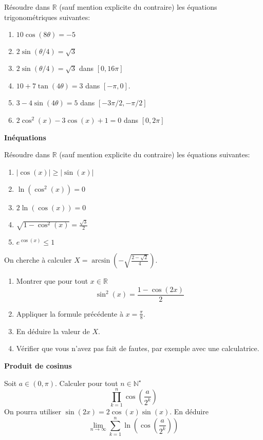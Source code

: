 \documentclass[a4paper,12pt]{article}
\def\N{\mathbb{N}}
\begin{document}
Résoudre dans $\mathbb{R}$ (sauf mention explicite du contraire) les équations trigonométriques suivantes:
\begin{enumerate}
\item $10\cos(8\theta) = -5$
\item $2\sin(\theta/4) = \sqrt{3}$
\item $2\sin(\theta/4) = \sqrt{3}$ dans $[0, 16\pi]$
\item $10 + 7\tan(4\theta) = 3$ dans $[-\pi, 0]$.
\item $3 - 4\sin(4\theta) = 5$ dans $[-3\pi/2, -\pi/2]$
\item $2\cos^2(x) - 3\cos(x) + 1 = 0$ dans $[0, 2\pi]$
\end{enumerate}

\Exo \textbf{Inéquations}

Résoudre dans $\mathbb{R}$ (sauf mention explicite du contraire) les équations suivantes:
\begin{enumerate}
\item $|\cos(x)| \geq |\sin(x)|$
\item $\ln(\cos^2(x)) = 0$
\item $2\ln(\cos(x)) = 0$
\item $\sqrt{1 - \cos^2(x)} = \frac{\sqrt{3}}{2}$
\item $e^{\cos(x)} \leq 1$
\end{enumerate}

\Exo {$\boldsymbol{\arcsin}$}

On cherche à calculer $X = \displaystyle \arcsin\left( - \sqrt{\frac{2 - \sqrt{2}}{4}}\right)$.
\begin{enumerate}
\item Montrer que pour tout $x \in \mathbb{R}$
  \begin{equation*}
    \sin^2(x)  = \frac{1 - \cos(2x)}{2}
  \end{equation*}
\item Appliquer la formule précédente à $x = \frac{\pi}{8}$.
\item En déduire la valeur de $X$.
\item Vérifier que vous n'avez pas fait de fautes, par exemple avec une calculatrice.
\end{enumerate}

\Exo \textbf{Produit de cosinus}

Soit $a \in (0, \pi)$. Calculer pour tout $n \in \N^\star$
\[
\prod_{k=1}^n \cos\left(\frac{a}{2^k}\right)
\]
On pourra utiliser $\sin(2x) = 2\cos(x)\sin(x)$. En déduire
\[
\lim_{n \to \infty} \sum_{k=1}^n \ln\left( \cos \left( \frac{a}{2^k} \right) \right)
\]
\end{document}
